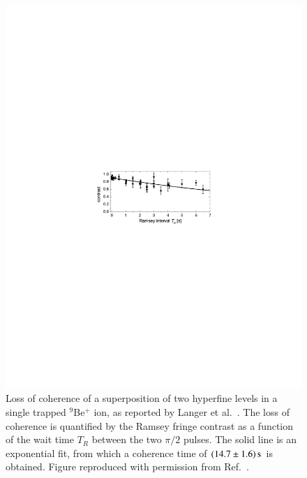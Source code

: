 \documentclass[3p,sort&compress]{elsarticle}
\begin{document}
\begin{figure}
\centering
\includegraphics[scale=0.9]{langer1.pdf} 
\caption{Loss of coherence of a superposition of two hyperfine levels in a single trapped $^9$Be$^+$ ion, as reported by Langer et al.\ \cite{Langer:2005:uu}. The loss of coherence is quantified by the Ramsey fringe contrast as a function of the wait time $T_R$ between the two $\pi/2$ pulses. The solid line is an exponential fit, from which a coherence time of $\unit[(14.7 \pm 1.6)]{s}$ is obtained.  Figure reproduced with permission from Ref.~\cite{Langer:2005:uu}.}
\label{fig:iondec}
\end{figure}
\end{document}
